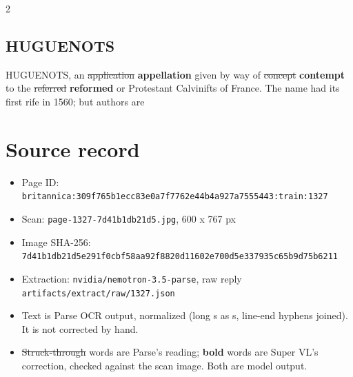 \documentclass[10pt]{article}
\begin{document}
\begin{multicols}{2}
\subsection*{HUGUENOTS}
HUGUENOTS, an \sout{application} \textbf{appellation} given by way of \sout{concept} \textbf{contempt} to the \sout{referred} \textbf{reformed} or Protestant Calvinifts of France. The name had its first rife in 1560; but authors are
\end{multicols}
\section*{Source record}
\begin{itemize}
\item Page ID: \texttt{britannica:309f765b1ecc83e0a7f7762e44b4a927a7555443:train:1327}
\item Scan: \texttt{page-1327-7d41b1db21d5.jpg}, 600 x 767 px
\item Image SHA-256: \texttt{\small 7d41b1db21d5e291f0cbf58aa92f8820d11602e700d5e337935c65b9d75b6211}
\item Extraction: \texttt{nvidia/nemotron-3.5-parse}, raw reply \texttt{artifacts/extract/raw/1327.json}
\item Text is Parse OCR output, normalized (long s as s, line-end hyphens joined). It is not corrected by hand.
\item \sout{Struck-through} words are Parse's reading; \textbf{bold} words are Super VL's correction, checked against the scan image. Both are model output.
\end{itemize}
\end{document}
